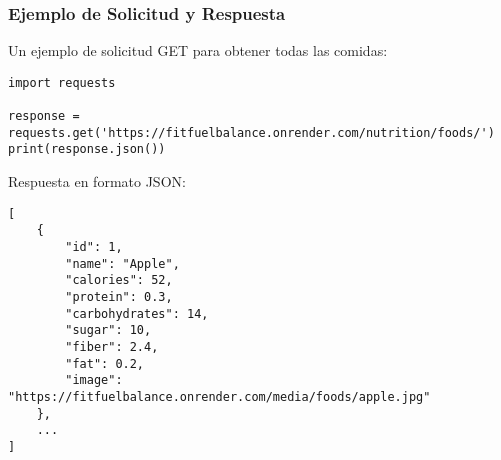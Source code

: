 \subsubsection{Ejemplo de Solicitud y Respuesta}
Un ejemplo de solicitud GET para obtener todas las comidas:

\begin{verbatim}
import requests

response = requests.get('https://fitfuelbalance.onrender.com/nutrition/foods/')
print(response.json())
\end{verbatim}

Respuesta en formato JSON:

\begin{verbatim}
[
    {
        "id": 1,
        "name": "Apple",
        "calories": 52,
        "protein": 0.3,
        "carbohydrates": 14,
        "sugar": 10,
        "fiber": 2.4,
        "fat": 0.2,
        "image": "https://fitfuelbalance.onrender.com/media/foods/apple.jpg"
    },
    ...
]
\end{verbatim}